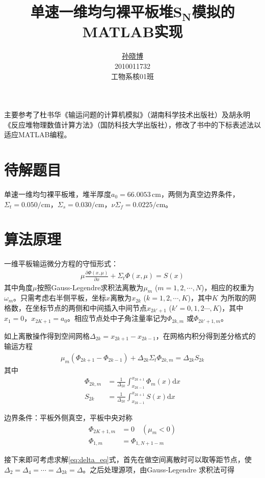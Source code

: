 \documentclass[a4paper,10.5pt]{article}
\title{\heiti 单速一维均匀裸平板堆$\boldsymbol{S_{N}}$模拟的MATLAB实现}
\author{\href{mailto:sunxb10@gmail.com}{孙晓博}\\2010011732\\{}工物系核01班}
\date{}
\newcommand\md {\mathrm{d}}
\newcommand \kaiti {\CJKfamily{KaiTi}}
\begin{document}
\maketitle
{\kaiti 主要参考了杜书华《输运问题的计算机模拟》（湖南科学技术出版社）及胡永明《反应堆物理数值计算方法》（国防科技大学出版社），修改了书中的下标表述法以适应MATLAB编程。}\par
\section{待解题目}
单速一维均匀裸平板堆，堆半厚度$a_{0}=66.0053\,\mathrm{cm}$，两侧为真空边界条件，$\Sigma_{t}=0.050/\mathrm{cm}$，$\Sigma_{s}=0.030/\mathrm{cm}$，$\nu\Sigma_{f}=0.0225/\mathrm{cm}$。\par
\section{算法原理}
一维平板输运微分方程的守恒形式：
\begin{align}
\mu\frac{\partial\Phi(x,\mu)}{\partial{}x}+\Sigma_{t}\Phi(x,\mu)=S(x)\label{eq:diff_eq}
\end{align}
其中角度$\mu$按照Gauss-Legendre求积法离散为$\mu_{m}$ ($m=1,2,\cdots,N$)，相应的权重为$\omega_{m}$。只需考虑右半侧平板，坐标$x$离散为$x_{2k}$ ($k=1,2,\cdots,K$)，其中$K$ 为所取的网格数，在坐标节点的两侧和中间插入中间节点$x_{2k'+1}$ ($k'=0,1,2\cdots,K$)，其中$x_{1}=0$，$x_{2K+1}=a_{0}$。相应节点处中子角注量率记为$\Phi_{2k,m}$ 或$\Phi_{2k'+1,m}$。\par
如上离散操作得到空间网格$\Delta_{2k}=x_{2k+1}-x_{2k-1}$，在网格内积分得到差分格式的输运方程
\begin{align}
\mu_{m}(\Phi_{2k+1}-\Phi_{2k-1})+\Delta_{2k}\Sigma_{t}\Phi_{2k,m}=\Delta_{2k}S_{2k}\label{eq:delta_eq}
\end{align}
其中
\begin{align*}
\Phi_{2k,m}&=\frac{1}{\Delta_{2k}}\int_{x_{2k-1}}^{x_{2k+1}}\Phi_{m}(x)\md{}x\\
S_{2k}&=\frac{1}{\Delta_{2k}}\int_{x_{2k-1}}^{x_{2k+1}}S(x)\md{}x
\end{align*}
\par
边界条件：平板外侧真空，平板中央对称
\begin{align}
\Phi_{2K+1,m}&=0\quad(\mu_{m}<0)\label{eq:outer_boundary}\\
\Phi_{1,m}&=\Phi_{1,N+1-m}\label{eq:inner_boundary}
\end{align}
\par
接下来即可考虑求解\eqref{eq:delta_eq}式，首先在做空间离散时可以取等距节点，使$\Delta_{2}=\Delta_{4}=\cdots=\Delta_{2k}=\Delta$。之后处理源项，由Gauss-Legendre 求积法可得
\end{document}
